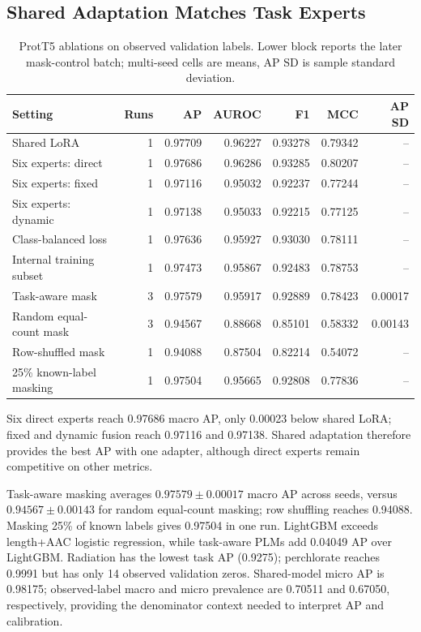 \documentclass[conference]{IEEEtran}
\begin{document}
\subsection{Shared Adaptation Matches Task Experts}
\begin{table}[t]
\centering
\caption{ProtT5 ablations on observed validation labels. Lower block reports the later mask-control batch; multi-seed cells are means, AP SD is sample standard deviation.}
\label{tab:3}
\footnotesize
\setlength{\tabcolsep}{3pt}
\begin{tabularx}{\textwidth}{@{}Xrrrrrr@{}}
\toprule
Setting & Runs & AP & AUROC & F1 & MCC & AP SD \\
\midrule
Shared LoRA & 1 & 0.97709 & 0.96227 & 0.93278 & 0.79342 & -- \\
Six experts: direct & 1 & 0.97686 & 0.96286 & 0.93285 & 0.80207 & -- \\
Six experts: fixed & 1 & 0.97116 & 0.95032 & 0.92237 & 0.77244 & -- \\
Six experts: dynamic & 1 & 0.97138 & 0.95033 & 0.92215 & 0.77125 & -- \\
Class-balanced loss & 1 & 0.97636 & 0.95927 & 0.93030 & 0.78111 & -- \\
Internal training subset & 1 & 0.97473 & 0.95867 & 0.92483 & 0.78753 & -- \\
\midrule
Task-aware mask & 3 & 0.97579 & 0.95917 & 0.92889 & 0.78423 & 0.00017 \\
Random equal-count mask & 3 & 0.94567 & 0.88668 & 0.85101 & 0.58332 & 0.00143 \\
Row-shuffled mask & 1 & 0.94088 & 0.87504 & 0.82214 & 0.54072 & -- \\
25\% known-label masking & 1 & 0.97504 & 0.95665 & 0.92808 & 0.77836 & -- \\
\bottomrule
\end{tabularx}
\end{table}

Six direct experts reach 0.97686 macro AP, only 0.00023 below shared LoRA; fixed and dynamic fusion reach 0.97116 and 0.97138. Shared adaptation therefore provides the best AP with one adapter, although direct experts remain competitive on other metrics.

Task-aware masking averages $0.97579\pm0.00017$ macro AP across seeds, versus $0.94567\pm0.00143$ for random equal-count masking; row shuffling reaches 0.94088. Masking 25\% of known labels gives 0.97504 in one run. LightGBM exceeds length+AAC logistic regression, while task-aware PLMs add 0.04049 AP over LightGBM. Radiation has the lowest task AP (0.9275); perchlorate reaches 0.9991 but has only 14 observed validation zeros. Shared-model micro AP is 0.98175; observed-label macro and micro prevalence are 0.70511 and 0.67050, respectively, providing the denominator context needed to interpret AP and calibration.
\end{document}
